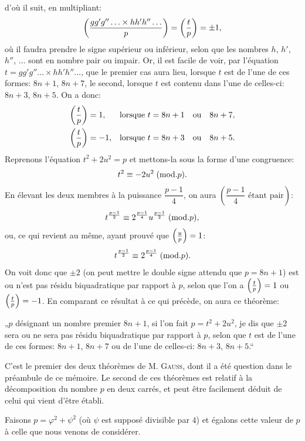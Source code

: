 \noindent
d'où il suit, en multipliant:
\[
\left(\frac{gg'g''\ldots\times hh'h''\ldots}{p}\right)=\left(\frac{t}{p}\right)=\pm1,
\]
où il faudra prendre le signe supérieur ou inférieur, selon que les nombres $h$,
$h'$, $h''$, $\ldots$ sont en nombre pair ou impair. Or, il est facile de voir, par
l'équation $t=gg'g''\ldots\times hh'h''\ldots$, que le premier cas aura lieu, lorsque $t$ est de
l'une de ces formes: $8n+1$, $8n+7$, le second, lorsque $t$ est contenu dans l'une
de celles-ci: $8n+3$, $8n+5$. On a donc:
\[
\begin{aligned}
\left(\frac{t}{p}\right)&=1, &&\text{lorsque }t=8n+1\quad\text{ou}\quad8n+7,\\
\left(\frac{t}{p}\right)&=-1, &&\text{lorsque }t=8n+3\quad\text{ou}\quad8n+5.
\end{aligned}
\]
Reprenons l'équation $t^2+2u^2=p$ et mettons-la sous la forme d'une congruence:
\[
t^2\equiv-2u^2\;(\mathrm{mod}.p).
\]
En élevant les deux membres à la puissance $\dfrac{p-1}{4}$, on aura $\left(\dfrac{p-1}{4}\text{ étant pair}\right)$:
\[
t^{\frac{p-1}{2}}\equiv2^{\frac{p-1}{4}}u^{\frac{p-1}{2}}\;(\mathrm{mod}.p),
\]
ou, ce qui revient au même, ayant prouvé que $\left(\frac{u}{p}\right)=1$:
\[
t^{\frac{p-1}{2}}\equiv2^{\frac{p-1}{4}}\;(\mathrm{mod}.p).
\]
On voit donc que $\pm2$ (on peut mettre le double signe attendu que $p=8n+1$)
est ou n'est pas résidu biquadratique par rapport à $p$, selon que l'on a $\left(\frac{t}{p}\right)=1$
ou $\left(\frac{t}{p}\right)=-1$. En comparant ce résultat à ce qui précède, on aura ce théorème:
\par\indent
„$p$ désignant un nombre premier $8n+1$, si l'on fait $p=t^2+2u^2$, je dis
que $\pm2$ sera ou ne sera pas résidu biquadratique par rapport à $p$, selon que
$t$ est de l'une de ces formes: $8n+1$, $8n+7$ ou de l'une de celles-ci: $8n+3$,
$8n+5$.“
\par\indent
C'est le premier des deux théorèmes de M. \textsc{Gauss}, dont il a été question
dans le préambule de ce mémoire. Le second de ces théorèmes est relatif à
la décomposition du nombre $p$ en deux carrés, et peut être facilement déduit
de celui qui vient d'être établi.
\par\indent
Faisons $p=\varphi^2+\psi^2$ (où $\psi$ est supposé divisible par $4$) et égalons cette
valeur de $p$ à celle que nous venons de considérer.
